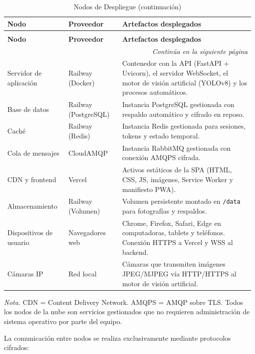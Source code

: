 \begin{longtable}{p{3cm} p{3cm} p{8cm}}
\caption{Nodos de Despliegue} \\
\toprule
\textbf{Nodo} & \textbf{Proveedor} & \textbf{Artefactos desplegados} \\
\midrule
\endfirsthead

\caption[]{Nodos de Despliegue (continuación)} \\
\toprule
\textbf{Nodo} & \textbf{Proveedor} & \textbf{Artefactos desplegados} \\
\midrule
\endhead

\midrule
\multicolumn{3}{r}{\footnotesize\textit{Continúa en la siguiente página}} \\
\endfoot

\bottomrule
\endlastfoot

Servidor de aplicación & Railway (Docker) & Contenedor con la API (FastAPI + Uvicorn), el servidor WebSocket, el motor de visión artificial (YOLOv8) y los procesos automáticos. \\
\midrule
Base de datos & Railway (PostgreSQL) & Instancia PostgreSQL gestionada con respaldo automático y cifrado en reposo. \\
\midrule
Caché & Railway (Redis) & Instancia Redis gestionada para sesiones, tokens y estado temporal. \\
\midrule
Cola de mensajes & CloudAMQP & Instancia RabbitMQ gestionada con conexión AMQPS cifrada. \\
\midrule
CDN y frontend & Vercel & Activos estáticos de la SPA (HTML, CSS, JS, imágenes, Service Worker y manifiesto PWA). \\
\midrule
Almacenamiento & Railway (Volumen) & Volumen persistente montado en \texttt{/data} para fotografías y respaldos. \\
\midrule
Dispositivos de usuario & Navegadores web & Chrome, Firefox, Safari, Edge en computadoras, tablets y teléfonos. Conexión HTTPS a Vercel y WSS al backend. \\
\midrule
Cámaras IP & Red local & Cámaras que transmiten imágenes JPEG/MJPEG vía HTTP/HTTPS al motor de visión artificial. \\
\end{longtable}

\textit{Nota.} CDN = Content Delivery Network. AMQPS = AMQP sobre TLS. Todos los nodos de la nube son servicios gestionados que no requieren administración de sistema operativo por parte del equipo.

La comunicación entre nodos se realiza exclusivamente mediante protocolos cifrados:

